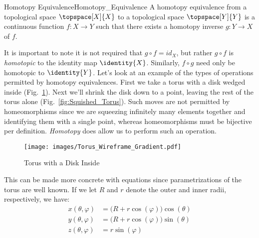 \documentclass{book}                                                           %
\begin{document}
                \begin{fdefinition}{Homotopy Equivalence}{Homotopy_Equivalence}
                    A homotopy equivalence from a topological space
                    $\topspace[X]{X}$ to a topological space $\topspace[Y]{Y}$
                    is a continuous function $f:X\rightarrow{Y}$ such that there
                    exists a homotopy inverse $g:Y\rightarrow{X}$ of $f$.
                \end{fdefinition}
                It is important to note it is not required that
                $g\circ{f}=id_{X}$, but rather $g\circ{f}$ is \textit{homotopic}
                to the identity map $\identity{X}$. Similarly, $f\circ{g}$ need
                only be homotopic to $\identity{Y}$. Let's look at an example of
                the types of operations permitted by homotopy equivalences.
                First we take a torus with a disk wedged inside
                (Fig.~\ref{fig:Torus_with_Disc_Inside}). Next we'll shrink the
                disk down to a point, leaving the rest of the torus alone
                (Fig.~\ref{fig:Squished_Torus}). Such moves are not permitted by
                homeomorphisms since we are squeezing infinitely many elements
                together and identifying them with a single point, whereas
                homeomorphisms must be bijective per definition.
                \textit{Homotopy} does allow us to perform such an operation.
                \begin{figure}[H]
                    \centering
                    \captionsetup{type=figure}
                    \texttt{[image: images/Torus\_Wireframe\_Gradient.pdf]}
                    \caption{Torus with a Disk Inside}
                    \label{fig:Torus_with_Disc_Inside}
                \end{figure}
                This can be made more concrete with equations since
                parametrizations of the torus are well known. If we let $R$ and
                $r$ denote the outer and inner radii, respectively, we have:
                \begin{subequations}
                    \begin{align}
                        x(\theta,\varphi)
                            &=\big(R+r\cos(\varphi)\big)\cos(\theta)\\
                        y(\theta,\varphi)
                            &=\big(R+r\cos(\varphi)\big)\sin(\theta)\\
                        z(\theta,\varphi)&=r\sin(\varphi)
                    \end{align}
                \end{subequations}
\end{document}
